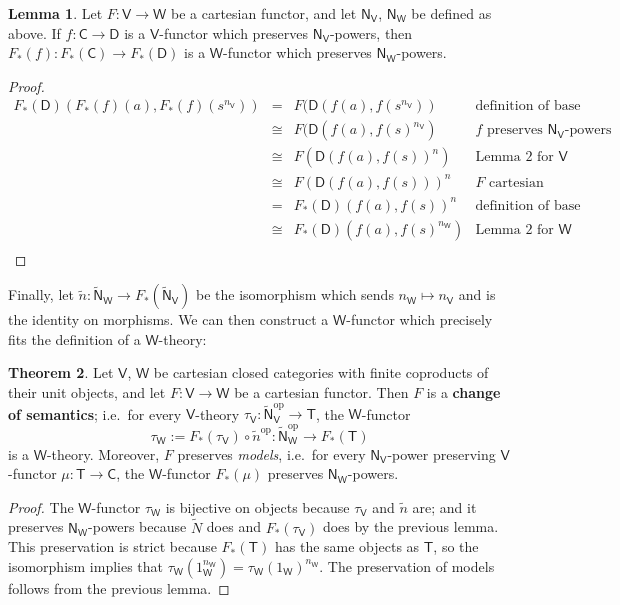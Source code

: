 \documentclass{amsart}
\theoremstyle{definition}
\newtheorem{theorem}{Theorem}
\newtheorem{lemma}[theorem]{Lemma}
\newcommand{\NN}{\mathsf{N}}
\newcommand{\V}{\mathsf{V}}
\newcommand{\W}{\mathsf{W}}
\newcommand{\D}{\mathsf{D}}
\newcommand{\C}{\mathsf{C}}
\newcommand{\T}{\mathsf{T}}
\newcommand{\op}{\mathrm{op}}
\newcommand{\maps}{\colon}
\begin{document}
\begin{lemma}
	Let $F\maps \V \to \W$ be a cartesian functor, and let $\NN_\V$, $\NN_\W$ be defined as above. If $f\maps \C \to \D$ is a $\V$-functor which preserves $\NN_\V$-powers, then $F_*(f)\maps F_*(\C)\to F_*(\D)$ is a $\W$-functor which preserves $\NN_\W$-powers.
\end{lemma}
\begin{proof}
	\[\begin{array}{rcll}
	F_*(\D)(F_*(f)(a),F_*(f)(s^{n_\V})) & = & F(\D(f(a),f(s^{n_\V})) & \text{definition of base change}\\
	& \cong & F(\D(f(a),f(s)^{n_\V}) & f \text{ preserves } \NN_\V \text{-powers}\\
	& \cong & F(\D(f(a),f(s))^n) & \text{Lemma 2 for } \V\\
	& \cong & F(\D(f(a),f(s)))^n & F \text{ cartesian}\\
	& = & F_*(\D)(f(a),f(s))^n & \text{definition of base change}\\
	& \cong & F_*(\D)(f(a),f(s)^{n_\W}) & \text{Lemma 2 for } \W\\
	\end{array}\]
\end{proof}

Finally, let $\tilde{n}\maps \tilde{\NN}_\W \to F_*(\tilde{\NN}_\V)$ be the isomorphism which sends $n_\W \mapsto n_\V$ and is the identity on morphisms. We can then construct a $\W$-functor which precisely fits the definition of a $\W$-theory:

\begin{theorem}
	Let $\V$, $\W$ be cartesian closed categories with finite coproducts of their unit objects, and let $F\maps \V \to \W$ be a cartesian functor. Then $F$ is a \textbf{change of semantics}; i.e.\ for every $\V$-theory $\tau_\V\maps \tilde{\NN}_\V^\op \to \T$, the $\W$-functor $$\tau_\W := F_*(\tau_\V) \circ \tilde{n}^\op\maps \tilde{\NN}_\W^\op \to F_*(\T)$$ is a $\W$-theory. Moreover, $F$ preserves \textit{models}, i.e.\ for every $\NN_\V$-power preserving $\V$-functor $\mu\maps\T \to \C$, the $\W$-functor $F_*(\mu)$ preserves $\NN_\W$-powers.
\end{theorem}
\begin{proof}
	The $\W$-functor $\tau_\W$ is bijective on objects because $\tau_\V$ and $\tilde{n}$ are; and it preserves $\NN_\W$-powers because $\tilde{N}$ does and $F_*(\tau_\V)$ does by the previous lemma. This preservation is strict because $F_*(\T)$ has the same objects as $\T$, so the isomorphism implies that $\tau_\W(1_\W^{n_\W}) = \tau_\W(1_\W)^{n_\W}$. The preservation of models follows from the previous lemma.
\end{proof}
\end{document}
